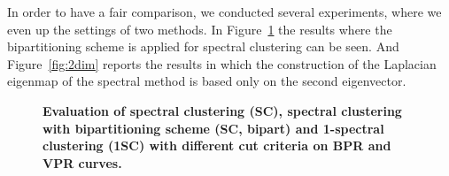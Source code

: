 In order to have a fair comparison, we conducted several experiments, where we even up the settings of two methods.
In Figure~\ref{fig:bipart} the results where the bipartitioning scheme is applied for spectral clustering can be seen. 
And Figure~\ref{fig:2dim} reports the results in which the construction of the Laplacian eigenmap of
the spectral method is based only on the second eigenvector. 
\begin{figure}[htbp]
 \centering
{}
\quad%
\caption[Evaluation of spectral clustering (SC), spectral clustering with bipartitioning scheme (SC, bipart) and 1-spectral clustering (1SC) with different cut criteria 
on boundary precision-recall (BPR) and volume precision-recall (VPR) curves]{
{\bf Evaluation of spectral clustering (SC), spectral clustering with bipartitioning scheme (SC, bipart) and 1-spectral clustering (1SC) with different cut criteria 
on BPR and VPR curves.}}
\label{fig:bipart}
\qquad
\vfill

\end{figure}
